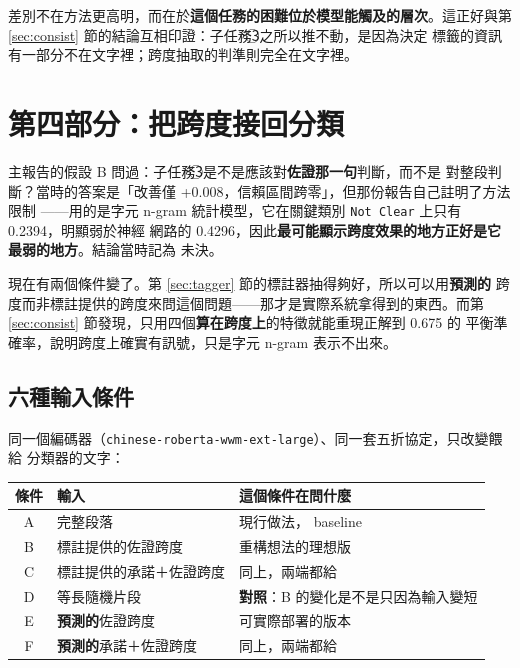 \documentclass[11pt,a4paper]{ctexart}
\newcommand{\fn}[1]{\texttt{#1}}
\begin{document}
差別不在方法更高明，而在於\textbf{這個任務的困難位於模型能觸及的層次}。這正好與第
\ref{sec:consist} 節的結論互相印證：子任務\textcircled{3}之所以推不動，是因為決定
標籤的資訊有一部分不在文字裡；跨度抽取的判準則完全在文字裡。

\section{第四部分：把跨度接回分類}
\label{sec:ltj}

主報告的假設 B 問過：子任務\textcircled{3}是不是應該對\textbf{佐證那一句}判斷，而不是
對整段判斷？當時的答案是「改善僅 +0.008，信賴區間跨零」，但那份報告自己註明了方法限制
——用的是字元 n-gram 統計模型，它在關鍵類別 \fn{Not Clear} 上只有 0.2394，明顯弱於神經
網路的 0.4296，因此\textbf{最可能顯示跨度效果的地方正好是它最弱的地方}。結論當時記為
未決。

現在有兩個條件變了。第 \ref{sec:tagger} 節的標註器抽得夠好，所以可以用\textbf{預測的}
跨度而非標註提供的跨度來問這個問題——那才是實際系統拿得到的東西。而第
\ref{sec:consist} 節發現，只用四個\textbf{算在跨度上}的特徵就能重現正解到 0.675 的
平衡準確率，說明跨度上確實有訊號，只是字元 n-gram 表示不出來。

\subsection{六種輸入條件}

同一個編碼器（\texttt{chinese-roberta-wwm-ext-large}）、同一套五折協定，只改變餵給
分類器的文字：

\begin{table}[h]
\centering\small
\begin{tabular}{@{}clp{6.3cm}@{}}
\toprule
條件 & 輸入 & 這個條件在問什麼 \\
\midrule
A & 完整段落 & 現行做法， baseline \\
B & 標註提供的佐證跨度 & 重構想法的理想版 \\
C & 標註提供的承諾＋佐證跨度 & 同上，兩端都給 \\
\rowcolor{yellow!12}
D & 等長隨機片段 & \textbf{對照}：B 的變化是不是只因為輸入變短 \\
E & \textbf{預測的}佐證跨度 & 可實際部署的版本 \\
F & \textbf{預測的}承諾＋佐證跨度 & 同上，兩端都給 \\
\bottomrule
\end{tabular}
\end{table}
\end{document}
